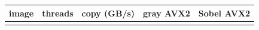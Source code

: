 \begin{center}
\small
\begin{tabular}{@{}lrrrr@{}}
\toprule
image & threads & copy (GB/s) & gray AVX2 & Sobel AVX2\\
\midrule
\\
\bottomrule
\end{tabular}
\end{center}
